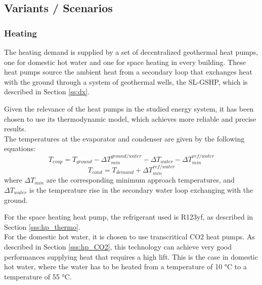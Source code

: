 \documentclass{article}
\begin{document}


\subsection{Variants / Scenarios}

\subsubsection{Heating}
The heating demand is supplied by a set of decentralized geothermal heat pumps, one for domestic hot water and one for space heating in every building. These heat pumps source the ambient heat from a secondary loop that exchanges heat with the ground through a system of geothermal wells, the SL-GSHP, which is described in Section \ref{ss:dx}. 

Given the relevance of the heat pumps in the studied energy system, it has been chosen to use its thermodynamic model, which achieves more reliable and precise results.\\

The temperatures at the evaporator and condenser are given by the following equations:
\begin{equation}
T_{evap} = T_{ground} - \Delta T_{min}^{ground/water} - \Delta T_{water} - \Delta T_{min}^{ref/water}
\end{equation}
\begin{equation}
T_{cond} = T_{demand} + \Delta T_{min}^{ref/water}
\end{equation}
where $\Delta T_{min}$ are the corresponding minimum approach temperatures, and $\Delta T_{water}$ is the temperature rise in the secondary water loop exchanging with the ground.

For the space heating heat pump, the refrigerant used is R123yf, as described in Section \ref{sss:hp_thermo}.\\

For the domestic hot water, it is chosen to use transcritical CO2 heat pumps. As described in Section \ref{sss:hp_CO2}, this technology can achieve very good performances supplying heat that requires a high lift. This is the case in domestic hot water, where the water has to be heated from a temperature of 10 \si{\celsius} to a temperature of 55 \si{\celsius}.
\end{document}
